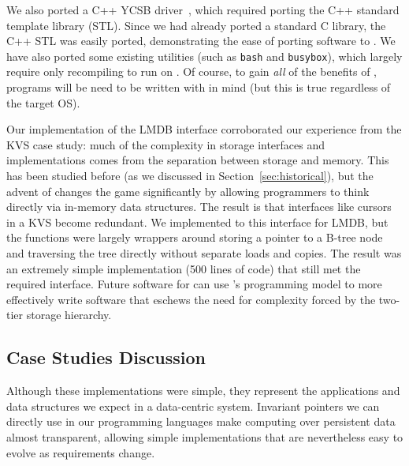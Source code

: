 We also ported a C++ YCSB driver~\cite{ycsbc}, which required porting the C++ standard template
library (STL). Since we had already ported a standard C library, the C++ STL was easily ported,
demonstrating the ease of porting software to \Twizzler.
We have also ported some existing \unix utilities (such as \texttt{bash} and
\texttt{busybox}), which largely require only recompiling to run on \Twizzler. Of
course, to gain \emph{all} of the benefits of \Twizzler, programs will be need to be
written with \NVM in mind (but this is true regardless of the target OS).

Our implementation of the LMDB interface
corroborated our experience from the KVS case study: much of the complexity in storage interfaces
and implementations comes from the separation between storage and memory. This has been
studied before (as we discussed in Section~\ref{sec:historical}), but the advent of \NVM changes the game
significantly by allowing programmers to think directly via in-memory data structures. The result is
that interfaces like cursors in a KVS become redundant. We implemented to this interface
for LMDB, but the functions were largely wrappers around storing a pointer
to a B-tree node and traversing the tree directly without separate loads and copies. The result was
an extremely simple implementation (500 lines of code) that still met the required interface. Future software
for \NVM can use \Twizzler's programming model to more effectively write software
that eschews the need for complexity forced by the two-tier storage hierarchy.



\subsection{Case Studies Discussion}

Although these implementations were simple, they represent the applications
and data structures we expect in a data-centric system. Invariant pointers
we can directly use in our programming languages make computing over persistent
data almost transparent, allowing simple implementations that are nevertheless
easy to evolve as requirements change.


